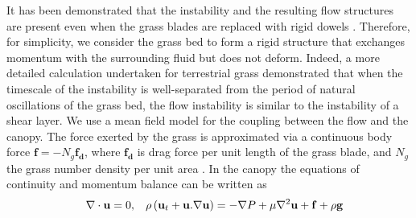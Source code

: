 \documentclass[aps,prl,twocolumn,superscriptaddress,10pt]{revtex4-1}  %
\newcommand{\bu}{\mathbf{u}}
\newcommand{\grad}{\mathbf{\nabla}}
\newcommand{\Rey}{\text{Re}}
\begin{document}
It has been demonstrated that the instability and the resulting flow structures are present even when the grass blades are replaced with rigid dowels \cite{Ghisal02}. 
Therefore, for simplicity, we consider the grass bed to form a rigid structure that exchanges momentum with the surrounding fluid but does not deform. 
Indeed, a more detailed calculation undertaken for terrestrial grass demonstrated \cite{Delangre06} that when the timescale of the instability is well-separated from the period of natural oscillations of the grass bed, 
the flow instability is similar to the instability of a shear layer. 
We use a mean field model for the coupling between the flow and the canopy. 
The force exerted by the grass is approximated via a continuous body force $\mathbf{f}=-N_g\mathbf{f_d}$,  
where $\mathbf{f_{d}}$ is drag force per unit length of the grass blade, and $N_g$ the grass number density per unit area \cite{Vivoni98,Nepf99,Ghisal02,Delangre04,Delangre06}. 
In the canopy the equations of continuity and momentum balance can be written as 
\begin{equation}
\quad \grad\cdot\bu = 0,\hspace{3mm} \rho \left(\bu_{t}+\bu.\grad\bu \right) = -\grad P+\mu\grad^{2}\bu +\mathbf{f}+\rho\mathbf{g}
\label{navier-stokes}
\end{equation}
\end{document}
